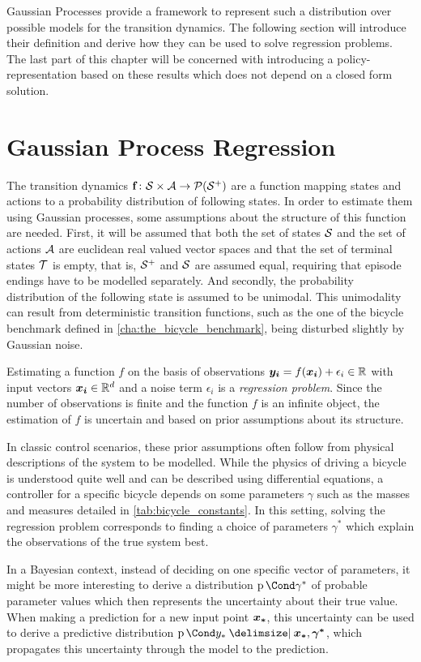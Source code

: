 Gaussian Processes provide a framework to represent such a distribution over possible models for the transition dynamics.
The following section will introduce their definition and derive how they can be used to solve regression problems.
The last part of this chapter will be concerned with introducing a policy-representation based on these results which does not depend on a closed form solution.

\section{Gaussian Process Regression}
\label{sec:gp_regression}
The transition dynamics $\operatorname{\mathbf{f}} \colon \mathcal{S} \times \mathcal{A} \to \operatorname{\mathcal{P}}(\mathcal{S}^+)$ are a function mapping states and actions to a probability distribution of following states.
In order to estimate them using Gaussian processes, some assumptions about the structure of this function are needed.
First, it will be assumed that both the set of states $\mathcal{S}$ and the set of actions $\mathcal{A}$ are euclidean real valued vector spaces and that the set of terminal states $\mathcal{T}$ is empty, that is, $\mathcal{S}^+$ and $\mathcal{S}$ are assumed equal, requiring that episode endings have to be modelled separately.
And secondly, the probability distribution of the following state is assumed to be unimodal.
This unimodality can result from deterministic transition functions, such as the one of the bicycle benchmark defined in \cref{cha:the_bicycle_benchmark}, being disturbed slightly by Gaussian noise.

Estimating a function $f$ on the basis of observations $\bm{y_i} = f(\bm{x_i}) + \epsilon_i \in \mathbb{R}$ with input vectors $\bm{x_i} \in \mathbb{R}^d$ and a noise term $\epsilon_i$ is a \emph{regression problem}.
Since the number of observations is finite and the function $f$ is an infinite object, the estimation of $f$ is uncertain and based on prior assumptions about its structure.

In classic control scenarios, these prior assumptions often follow from physical descriptions of the system to be modelled.
While the physics of driving a bicycle is understood quite well and can be described using differential equations, a controller for a specific bicycle depends on some parameters $\gamma$ such as the masses and measures detailed in \cref{tab:bicycle_constants}.
In this setting, solving the regression problem corresponds to finding a choice of parameters $\gamma^\ast$ which explain the observations of the true system best.

In a Bayesian context, instead of deciding on one specific vector of parameters, it might be more interesting to derive a distribution $\Prob{\gamma^*}$ of probable parameter values which then represents the uncertainty about their true value.
When making a prediction for a new input point $\bm{x_\ast}$, this uncertainty can be used to derive a predictive distribution $\Prob{y_\ast \given \mat{x_\ast}, \mat{\gamma^\ast}}$, which propagates this uncertainty through the model to the prediction.

